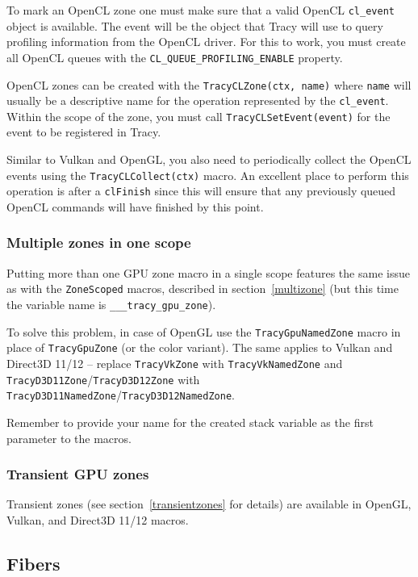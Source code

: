 \documentclass[hidelinks,titlepage,a4paper]{article}
\begin{document}
To mark an OpenCL zone one must make sure that a valid OpenCL \texttt{cl\_event} object is available. The event will be the object that Tracy will use to query profiling information from the OpenCL driver. For this to work, you must create all OpenCL queues with the \texttt{CL\_QUEUE\_PROFILING\_ENABLE} property.

OpenCL zones can be created with the \texttt{TracyCLZone(ctx, name)} where \texttt{name} will usually be a descriptive name for the operation represented by the \texttt{cl\_event}. Within the scope of the zone, you must call \texttt{TracyCLSetEvent(event)} for the event to be registered in Tracy.

Similar to Vulkan and OpenGL, you also need to periodically collect the OpenCL events using the \texttt{TracyCLCollect(ctx)} macro. An excellent place to perform this operation is after a \texttt{clFinish} since this will ensure that any previously queued OpenCL commands will have finished by this point.

\subsubsection{Multiple zones in one scope}

Putting more than one GPU zone macro in a single scope features the same issue as with the \texttt{ZoneScoped} macros, described in section~\ref{multizone} (but this time the variable name is \texttt{\_\_\_tracy\_gpu\_zone}).

To solve this problem, in case of OpenGL use the \texttt{TracyGpuNamedZone} macro in place of \texttt{TracyGpuZone} (or the color variant). The same applies to Vulkan and Direct3D 11/12 -- replace \texttt{TracyVkZone} with \texttt{TracyVkNamedZone} and \texttt{TracyD3D11Zone}/\texttt{TracyD3D12Zone} with \texttt{TracyD3D11NamedZone}/\texttt{TracyD3D12NamedZone}.

Remember to provide your name for the created stack variable as the first parameter to the macros.

\subsubsection{Transient GPU zones}

Transient zones (see section~\ref{transientzones} for details) are available in OpenGL, Vulkan, and Direct3D 11/12 macros.

\subsection{Fibers}
\label{fibers}
\end{document}
